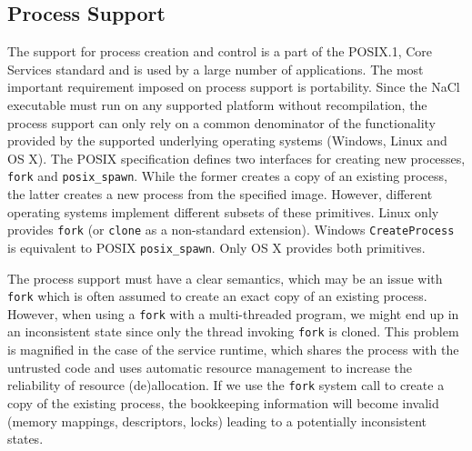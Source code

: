 

\subsection{Process Support}
\label{sub:process_support}

The support for process creation and control is a part of the POSIX.1,
Core Services standard and is used by a large number of applications.
The most important requirement imposed on process support is
portability. Since the NaCl executable must run on any supported
platform without recompilation, the process support can only rely on a
common denominator of the functionality provided by the supported
underlying operating systems (\ie Windows, Linux and OS X). The POSIX
specification defines two interfaces for creating new processes,
\lstinline`fork` and \lstinline`posix_spawn`. While the former creates a
copy of an existing process, the latter creates a new process from the
specified image.  However, different operating systems implement
different subsets of these primitives. Linux only provides
\lstinline`fork` (or \lstinline`clone` as a non-standard extension).
Windows \lstinline`CreateProcess` is equivalent to POSIX
\lstinline`posix_spawn`. Only OS X provides both primitives.

The process support must have a clear semantics, which may be an issue
with \lstinline`fork` which is often assumed to create an exact copy of
an existing process. However, when using a \lstinline`fork` with a
multi-threaded program, we might end up in an inconsistent state since
only the thread invoking \lstinline`fork` is cloned.  This problem is
magnified in the case of the service runtime, which shares the process
with the untrusted code and uses automatic resource management to
increase the reliability of resource (de)allocation. If we use the
\lstinline`fork` system call to create a copy of the existing process,
the bookkeeping information will become invalid (\eg memory mappings,
descriptors, locks) leading to a potentially inconsistent states.

